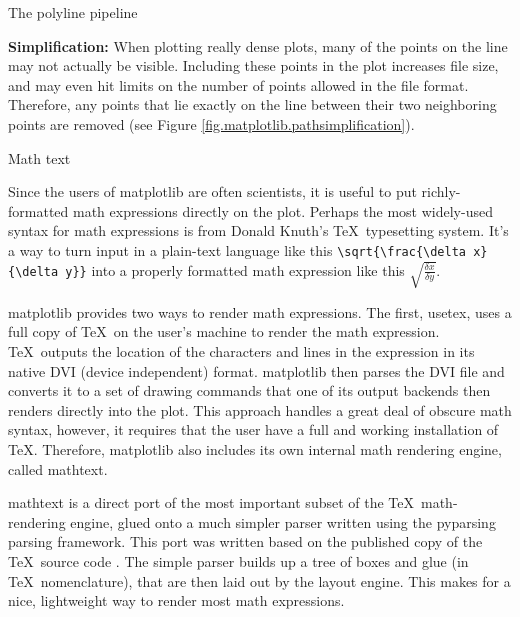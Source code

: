 \begin{aosasect1}{The polyline pipeline}
\begin{aosaenumerate}
\item \textbf{Simplification:} When plotting really dense plots, many
  of the points on the line may not actually be visible.  Including
  these points in the plot increases file size, and may even hit
  limits on the number of points allowed in the file format.
  Therefore, any points that lie exactly on the line between their two
  neighboring points are removed (see Figure
  \ref{fig.matplotlib.pathsimplification}).

\end{aosaenumerate}



\end{aosasect1}

\begin{aosasect1}{Math text}

Since the users of matplotlib are often scientists, it is useful to
put richly-formatted math expressions directly on the plot.  Perhaps
the most widely-used syntax for math expressions is from Donald
Knuth's \TeX\ typesetting system.  It's a way to turn input in a
plain-text language like this \verb+\sqrt{\frac{\delta x}{\delta y}}+
into a properly formatted math expression like this
$\sqrt{\frac{\delta x}{\delta y}}$.

matplotlib provides two ways to render math expressions.  The first,
usetex, uses a full copy of \TeX\ on the user's machine to render the
math expression.  \TeX\ outputs the location of the characters and
lines in the expression in its native DVI (device independent) format.
matplotlib then parses the DVI file and converts it to a set of
drawing commands that one of its output backends then renders directly
into the plot.  This approach handles a great deal of obscure math
syntax, however, it requires that the user have a full and working
installation of \TeX.  Therefore, matplotlib also includes its own
internal math rendering engine, called mathtext.

mathtext is a direct port of the most important subset of the
\TeX\ math-rendering engine, glued onto a much simpler parser written
using the pyparsing \cite{bib:pyparsing} parsing framework.  This port
was written based on the published copy of the \TeX\ source code
\cite{bib:texprogram}.  The simple parser builds up a tree of boxes
and glue (in \TeX\ nomenclature), that are then laid out by the
layout engine.  This makes for a nice, lightweight way to render most
math expressions.

\end{aosasect1}

